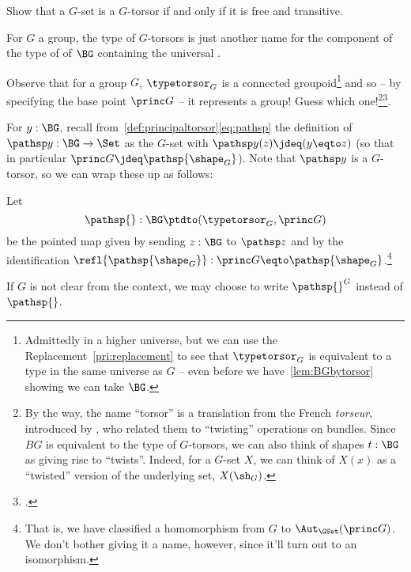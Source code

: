 \begin{xca}\label{xca:torsor=free+transitive}
  Show that a $G$-set is a $G$-torsor if and only if it is free and transitive.
\end{xca}

\begin{remark}
  For $G$ a group, the type of $G$-torsors is just another name for the component of the type of \coverings of $\BG$ containing the universal \covering.

  Observe that for a group $G$, $\typetorsor_G$ is a connected groupoid\footnote{Admittedly in a higher universe, but we can use the
    Replacement~\cref{pri:replacement} to see that $\typetorsor_G$ is equivalent
    to a type in the same universe as $G$ -- even before we
    have~\cref{lem:BGbytorsor} showing we can take $\BG$.}
  and so -- by specifying the base point $\princ G$ -- it represents a group!
  Guess which one!\footnote{%
    By the way, the name ``torsor'' is a translation from the French \emph{torseur},
    introduced by \citeauthor{giraud1971},\footnotemark{} who
    related them to “twisting” operations on bundles.
    Since $BG$ is equivalent to the type of $G$-torsors,
    we can also think of shapes $t:\BG$ as giving rise to “twists”.
    Indeed, for a $G$-set $X$,
    we can think of $X(x)$ as a ``twisted'' version of the underlying set,
    $X(\sh_G)$.}\footcitetext{giraud1971}.
\end{remark}

For $y:\BG$, recall from~\cref{def:principaltorsor}\eqref{eq:pathsp}
the definition of $\pathsp y:\BG\to\Set$ as the
$G$-set with $\pathsp y(z)\jdeq(y\eqto z)$
(so that in particular $\princ G\jdeq\pathsp{\shape_G}$).
Note that $\pathsp y$ is a $G$-torsor, so we can wrap these up as follows:

\begin{definition}
  \label{def:BG2TorsG}
  Let
  \[
    \pathsp{}:\BG\ptdto(\typetorsor_G,\princ G)
  \]
  be the pointed map given by sending $z:\BG$ to $\pathsp z$
  and by the identification
  $\refl{\pathsp{\shape_G}}:\princ G\eqto\pathsp{\shape_G}$.\footnote{%
    That is, we have classified a homomorphism from $G$
    to $\Aut_{\GSet}(\princ G)$. We don't bother giving it a name,
    however, since it'll turn out to an isomorphism.}
\end{definition}
If $G$ is not clear from the context, we may choose to write $\pathsp{}^G$ instead of $\pathsp{}$.


